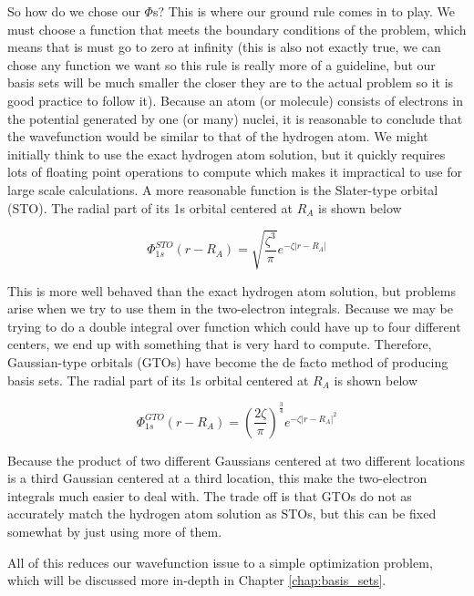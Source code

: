 \documentclass[12pt]{report}
\begin{document}
So how do we chose our $\Phi$s? This is where our ground rule comes in to play. We must choose a function that meets the boundary conditions of the problem, which means that is must go to zero at infinity (this is also not exactly true, we can chose any function we want so this rule is really more of a guideline, but our basis sets will be much smaller the closer they are to the actual problem so it is good practice to follow it). Because an atom (or molecule) consists of electrons in the potential generated by one (or many) nuclei, it is reasonable to conclude that the wavefunction would be similar to that of the hydrogen atom. We might initially think to use the exact hydrogen atom solution, but it quickly requires lots of floating point operations to compute which makes it impractical to use for large scale calculations. A more reasonable function is the Slater-type orbital (STO)\cite{PhysRev.36.57}. The radial part of its 1s orbital centered at $R_{A}$ is shown below

\begin{equation}
\label{eq:sto_1s}
\Phi^{STO}_{1s}(r - R_{A}) = \sqrt{\frac{\zeta^{3}}{\pi}}e^{-\zeta|r- R_{A}|}
\end{equation}

This is more well behaved than the exact hydrogen atom solution, but problems arise when we try to use them in the two-electron integrals. Because we may be trying to do a double integral over function which could have up to four different centers, we end up with something that is very hard to compute. Therefore, Gaussian-type orbitals (GTOs) have become the de facto method of producing basis sets. The radial part of its 1s orbital centered at $R_{A}$ is shown below\cite{Boys542}

\begin{equation}
\label{eq:gto_1s}
\Phi^{GTO}_{1s}(r - R_{A}) = \left(\frac{2\zeta}{\pi}\right)^{\frac{3}{4}}e^{-\zeta|r- R_{A}|^{2}}
\end{equation}

Because the product of two different Gaussians centered at two different locations is a third Gaussian centered at a third location, this make the two-electron integrals much easier to deal with. The trade off is that GTOs do not as accurately match the hydrogen atom solution as STOs, but this can be fixed somewhat by just using more of them.

All of this reduces our wavefunction issue to a simple optimization problem, which will be discussed more in-depth in Chapter \ref{chap:basis_sets}.
\end{document}
